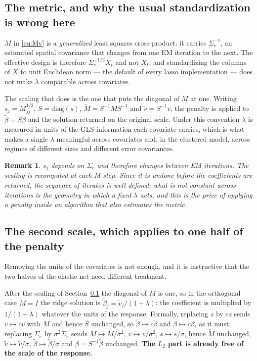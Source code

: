 \documentclass[11pt,a4paper]{article}
\newtheorem{remark}{Remark}
\newcommand{\Sig}{\Sigma}
\newcommand{\Se}{\Sig_{e}}
\begin{document}
\subsection{The metric, and why the usual standardization is wrong here}
\label{sec:metric}

$M$ in \eqref{eq:Mv} is a \emph{generalized} least squares cross-product: it
carries $\Se^{-1}$, an estimated spatial covariance that changes from one EM
iteration to the next. The effective design is therefore
$\Se^{-1/2}X_t$ and not $X_t$, and standardizing the columns of $X$ to unit
Euclidean norm --- the default of every lasso implementation --- does not make
$\lambda$ comparable across covariates.

The scaling that does is the one that puts the diagonal of $M$ at one. Writing
$s_j = M_{jj}^{1/2}$, $S = \mathrm{diag}(s)$, $\tilde M = S^{-1}MS^{-1}$ and
$\tilde v = S^{-1}v$, the penalty is applied to $\tilde\beta = S\beta$ and the
solution returned on the original scale. Under this convention $\lambda$ is
measured in units of the GLS information each covariate carries, which is what
makes a single $\lambda$ meaningful across covariates and, in the clustered
model, across regimes of different sizes and different error covariances.

\begin{remark}
$s_j$ depends on $\Se$ and therefore changes between EM iterations. The scaling
is recomputed at each M-step. Since it is undone before the coefficients are
returned, the sequence of iterates is well defined; what is not constant across
iterations is the geometry in which a fixed $\lambda$ acts, and this is the
price of applying a penalty inside an algorithm that also estimates the metric.
\end{remark}

\subsection{The second scale, which applies to one half of the penalty}
\label{sec:scale2}

Removing the units of the covariates is not enough, and it is instructive that
the two halves of the elastic net need different treatment.

After the scaling of Section~\ref{sec:metric} the diagonal of $\tilde M$ is one,
so in the orthogonal case $\tilde M = I$ the ridge solution is
$\tilde\beta_j = \tilde v_j / (1+\lambda)$: the coefficient is multiplied by
$1/(1+\lambda)$ whatever the units of the response. Formally, replacing $z$ by
$cz$ sends $v \mapsto cv$ with $M$ and hence $S$ unchanged, so
$\tilde\beta \mapsto c\tilde\beta$ and $\beta \mapsto c\beta$, as it must;
replacing $\Se$ by $\sigma^2\Se$ sends $M \mapsto M/\sigma^2$,
$v \mapsto v/\sigma^2$, $s \mapsto s/\sigma$, hence $\tilde M$ unchanged,
$\tilde v \mapsto \tilde v/\sigma$, $\tilde\beta \mapsto \tilde\beta/\sigma$
and $\beta = S^{-1}\tilde\beta$ unchanged. \textbf{The $L_2$ part is already
free of the scale of the response.}
\end{document}

